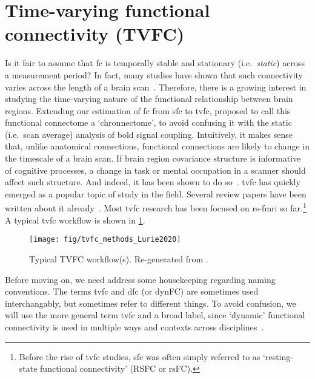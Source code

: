 \clearpage
\section{Time-varying functional connectivity (TVFC)}
\label{sec:tvfc}

Is it fair to assume that \gls{fc} is temporally stable and stationary (i.e.~\emph{static}) across a measurement period?
In fact, many studies have shown that such connectivity varies across the length of a brain scan~\parencite{Chang2010, Sakoglu2010, Cribben2012, Lang2012, Hutchison2013, Hutchison2013b, Allen2014, Lindquist2014, Gonzalez-Castillo2015, Leonardi2015, Preti2017}.
Therefore, there is a growing interest in studying the time-varying nature of the functional relationship between brain regions.
Extending our estimation of \gls{fc} from \gls{sfc} to \gls{tvfc}, \textcite{Calhoun2014} proposed to call this functional connectome a `chronnectome', to avoid confusing it with the static (i.e.~scan average) analysis of \gls{bold} signal coupling.
%
Intuitively, it makes sense that, unlike anatomical connections, functional connections are likely to change in the timescale of a brain scan.
If brain region covariance structure is informative of cognitive processes, a change in task or mental occupation in a scanner should affect such structure.
And indeed, it has been shown to do so~\parencite{Doucet2012}.
%
\gls{tvfc} has quickly emerged as a popular topic of study in the field.
Several review papers have been written about it already~\parencite{Hutchison2013, Calhoun2014, Chen2017, Preti2017, Lurie2020}.
Most \gls{tvfc} research has been focused on \gls{rs-fmri} so far.\footnote{Before the rise of \gls{tvfc} studies, \gls{sfc} was often simply referred to as `resting-state functional connectivity' (RSFC or rsFC).}
A typical \gls{tvfc} workflow is shown in \cref{fig:tvfc-workflow}.


\begin{figure}[t]
  \centering
  \texttt{[image: fig/tvfc\_methods\_Lurie2020]}
  \caption{
    Typical TVFC workflow(s).
    Re-generated from \textcite{Lurie2020}.
  }
  \label{fig:tvfc-workflow}
\end{figure}


Before moving on, we need address some housekeeping regarding naming conventions.
The terms \gls{tvfc} and \gls{dfc} (or dynFC) are sometimes used interchangably, but sometimes refer to different things.
To avoid confusion, we will use the more general term \gls{tvfc} and a broad label, since `dynamic' functional connectivity is used in multiple ways and contexts across disciplines~\parencite[see][for more details]{Lurie2020}.

